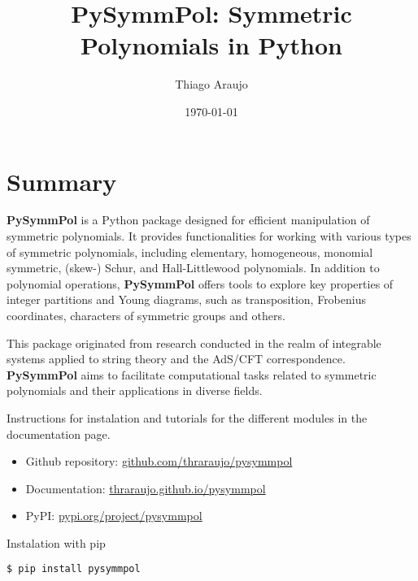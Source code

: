 \documentclass[a4paper,10pt]{amsart}
\begin{document}
\title[PySymmPol]{PySymmPol: Symmetric Polynomials in Python}

\author{Thiago Araujo}

\address{\noindent 
Institute for Theoretical Physics, UNESP-Universidade Estadual Paulista
R. Dr. Bento T. Ferraz 271, Bl. II, Sao Paulo 01140-070, SP, Brazil\\
and
Institute of Physics\\
Universidade de S\~ao Paulo\\ 
Rua do Matão Travessa 1371, 05508-090\\
São Paulo, SP. Brazil}


\date{\today}

\maketitle

\setcounter{tocdepth}{1}
\tableofcontents


\section{Summary}

\textbf{PySymmPol} is a Python package designed for efficient manipulation of
symmetric polynomials. It provides functionalities for working with
various types of symmetric polynomials, including elementary,
homogeneous, monomial symmetric, (skew-) Schur, and Hall-Littlewood
polynomials. In addition to polynomial operations, \textbf{PySymmPol} offers
tools to explore key properties of integer partitions and Young
diagrams, such as transposition, Frobenius coordinates, characters of
symmetric groups and others. 

This package originated from research conducted in the realm of
integrable systems applied to string theory and the AdS/CFT
correspondence. \textbf{PySymmPol} aims to facilitate computational tasks
related to symmetric polynomials and their applications in diverse
fields.

Instructions for instalation and tutorials for the different modules in the documentation page. 
\begin{itemize}
    \item Github repository: \href{https://github.com/thraraujo/pysymmpol}{github.com/thraraujo/pysymmpol}
    \item Documentation: \href{https://thraraujo.github.io/pysymmpol}{thraraujo.github.io/pysymmpol}
    \item PyPI: \href{https://pypi.org/project/pysymmpol}{pypi.org/project/pysymmpol}
\end{itemize}
Instalation with pip 
\begin{lstlisting}[language=Python]
  $ pip install pysymmpol
\end{lstlisting}
\end{document}
